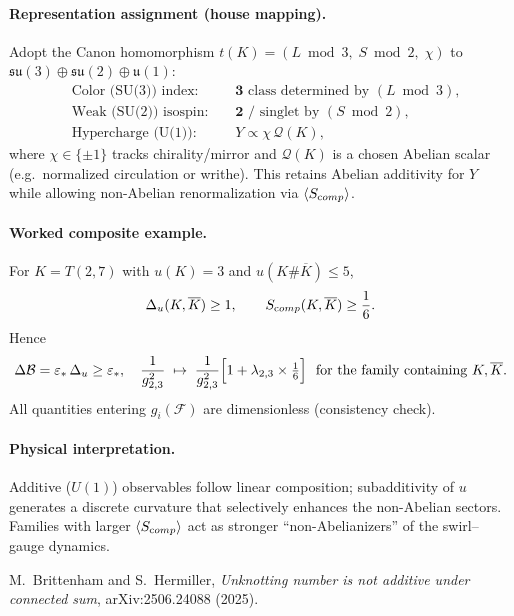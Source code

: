 \documentclass[11pt]{article}
\begin{document}
\paragraph{Representation assignment (house mapping).}
    Adopt the Canon homomorphism \(t(K)=(L \bmod 3,\;S \bmod 2,\;\chi)\) to \(\mathfrak{su}(3)\oplus\mathfrak{su}(2)\oplus\mathfrak u(1)\):
    \[
        \begin{aligned}
        &\text{Color (SU(3)) index: } &&\mathbf 3 \text{ class determined by } (L \bmod 3),\\
        &\text{Weak (SU(2)) isospin: } &&\mathbf 2 \text{ / singlet by } (S \bmod 2),\\
        &\text{Hypercharge (U(1)): } &&Y\propto \chi\, \mathcal Q(K),
        \end{aligned}
    \]
    where \(\chi\in\{\pm1\}\) tracks chirality/mirror and \(\mathcal Q(K)\) is a chosen Abelian scalar (e.g.\ normalized circulation or writhe). This retains Abelian additivity for \(Y\) while allowing non-Abelian renormalization via \(\langle S_{\textrm comp}\rangle\).

\paragraph{Worked composite example.}
    For \(K=T(2,7)\) with \(u(K)=3\) and \(u(K\#\overline K)\le 5\),
    \[
        \Delta_u(K,\overline K)\ge 1,\qquad
        S_{\textrm comp}(K,\overline K)\ge \frac{1}{6}.
    \]
    Hence
    \[
        \Delta\mathcal B=\varepsilon_*\,\Delta_u\ge \varepsilon_*,
        \quad
        \frac{1}{g_{2,3}^2}\;\mapsto\;\frac{1}{g_{2,3}^2}\Bigl[1+\lambda_{2,3}\times\tfrac{1}{6}\Bigr]
        \ \ \text{for the family containing }K,\overline K.
    \]
    All quantities entering \(g_i(\mathcal F)\) are dimensionless (consistency check).

\paragraph{Physical interpretation.}
    Additive (\(U(1)\)) observables follow linear composition; subadditivity of \(u\) generates a discrete curvature that selectively enhances the non-Abelian sectors. Families with larger \(\langle S_{\textrm comp}\rangle\) act as stronger “non-Abelianizers” of the swirl–gauge dynamics.

    \begin{thebibliography}{9}
    M.~Brittenham and S.~Hermiller,
    \emph{Unknotting number is not additive under connected sum},
    arXiv:2506.24088 (2025).
    \end{thebibliography}
\end{document}
